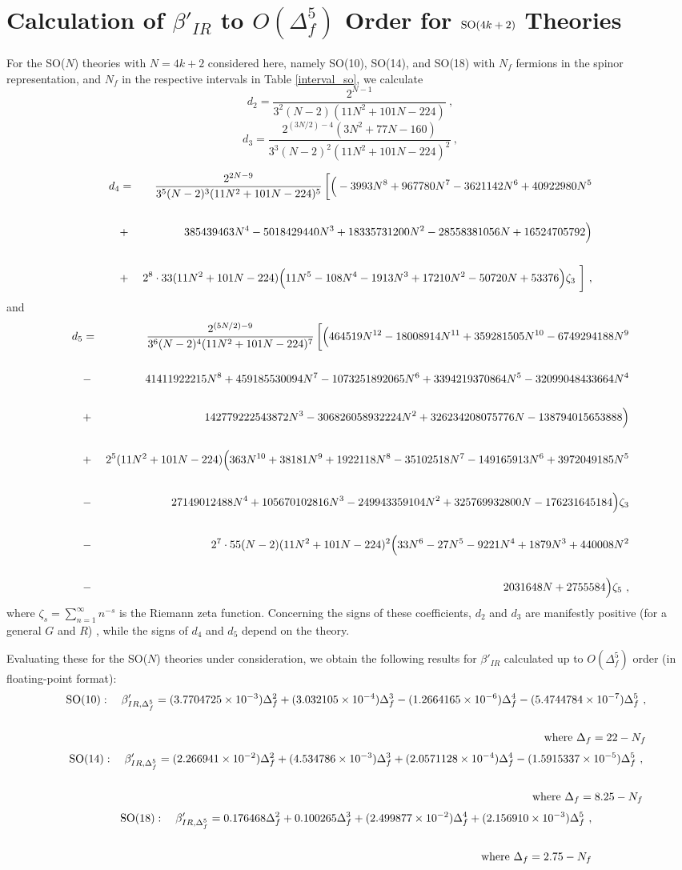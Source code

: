 \documentclass[prd,twocolumn,nofootinbib,amsfonts,amssymb]{revtex4}
\newcommand{\beq}{\begin{equation}}
\newcommand{\eeq}{\end{equation}}
\newcommand{\beqs}{\begin{eqnarray}}
\newcommand{\eeqs}{\end{eqnarray}}
\begin{document}

\section{Calculation of $\beta'_{IR}$ to $O(\Delta_f^5)$ Order for 
${\rm SO}(4k+2)$ Theories} 
\label{betaprime_so_section}

For the SO($N$) theories with $N=4k+2$ considered here, namely SO(10), SO(14),
and SO(18) with $N_f$ fermions in the spinor representation, and $N_f$ in the
respective intervals in Table \ref{interval_so}, we calculate
%
\beq
d_2 = \frac{2^{N-1}}{3^2 (N-2)(11N^2+101N-224)} \ , 
\label{d2_so}
\eeq
%
\bigskip
%
\beq
d_3 = \frac{2^{(3N/2)-4}(3N^2+77N-160)}{3^3 (N-2)^2(11N^2+101N-224)^2} \ , 
\label{d3_so}
\eeq
%
\begin{widetext}
%
\beqs
d_4 &=& \frac{2^{2N-9}}{3^5 (N-2)^3 (11N^2+101N-224)^5} \, \bigg [
\Big ( -3993N^8+967780N^7-3621142N^6+40922980N^5 \cr\cr
&+&385439463N^4-5018429440N^3+18335731200N^2-28558381056N+16524705792 
\Big ) \cr\cr
&+&2^8 \cdot 33(11N^2+101N-224)\Big (11N^5-108N^4-1913N^3+17210N^2-50720N
+53376 \Big )\zeta_3 \ \bigg ] \ , 
\label{d4_so}
\eeqs
%
and
%
\beqs
d_5 &=& \frac{2^{(5N/2)-9}}{3^6 (N-2)^4(11N^2+101N-224)^7} \, \bigg [
\Big ( 464519N^{12}  -18008914N^{11} +359281505N^{10} -6749294188N^9 \cr\cr
&-&41411922215N^8 + 459185530094N^7 -1073251892065N^6 +3394219370864N^5 
-32099048433664N^4 \cr\cr
&+& 142779222543872N^3 -306826058932224N^2 + 326234208075776N -
138794015653888 \Big ) \cr\cr
&+&2^5(11N^2+101N-224)\Big (363N^{10} +38181N^9 + 1922118N^8 -35102518N^7 
-149165913N^6 +3972049185N^5 \cr\cr
&-&27149012488N^4 + 105670102816N^3 -249943359104N^2 +325769932800N 
-176231645184 \Big ) \zeta_3 \cr\cr
&-&2^7 \cdot 55(N-2)(11N^2+101N-224)^2\Big ( 33N^6 -27N^5 - 9221N^4 
+ 1879N^3 + 440008N^2 \cr\cr
&-& 2031648N + 2755584 \Big )\zeta_5 \ , 
\label{d5_so}
\eeqs
%
where $\zeta_s = \sum_{n=1}^\infty n^{-s}$ is the Riemann zeta function. 
Concerning the signs of these coefficients, $d_2$ and $d_3$ are manifestly 
positive (for a general $G$ and $R$) \cite{dex}, while the signs of $d_4$ and
$d_5$ depend on the theory. 

Evaluating these for the SO($N$) theories under consideration, we obtain
the following results for $\beta'_{IR}$ calculated up to $O(\Delta_f^5)$ order
(in floating-point format):
%
\beqs
&&{\rm SO}(10): \quad \beta'_{IR,\Delta_f^5} = 
 (3.7704725 \times 10^{-3})\Delta_f^2 
+(3.032105 \times 10^{-4})\Delta_f^3
-(1.2664165 \times 10^{-6})\Delta_f^4
-(5.4744784 \times 10^{-7})\Delta_f^5 \ , \cr\cr
&& {\rm where} \ \Delta_f = 22-N_f 
\label{betaprime_so10_p5}
\eeqs
%
%
\beqs
&&{\rm SO}(14): \quad \beta'_{IR,\Delta_f^5} =
 (2.266941 \times 10^{-2})\Delta_f^2 
+(4.534786 \times 10^{-3})\Delta_f^3 
+(2.0571128 \times 10^{-4})\Delta_f^4 
-(1.5915337 \times 10^{-5})\Delta_f^5 \ ,  \cr\cr
&& {\rm where} \ \Delta_f = 8.25-N_f 
\label{betaprime_so14_p5}
\eeqs
%
%
\beqs
&&{\rm SO}(18): \quad \beta'_{IR,\Delta_f^5} =
 0.176468 \Delta_f^2 
+0.100265 \Delta_f^3 
+(2.499877 \times 10^{-2})\Delta_f^4 
+(2.156910 \times 10^{-3})\Delta_f^5 \ , \cr\cr
&& {\rm where} \ \Delta_f = 2.75-N_f 
\label{betaprime_so18_p5}
\eeqs
%
\end{widetext}
\end{document}
